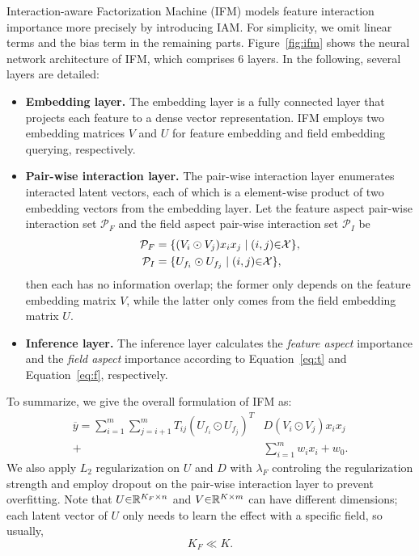 \documentclass[letterpaper]{article} \usepackage{aaai19}  \usepackage{times}  \usepackage{helvet}  \usepackage{courier}  \usepackage{url}  \usepackage{graphicx}  \frenchspacing  \setlength{\pdfpagewidth}{8.5in}  \setlength{\pdfpageheight}{11in}  \usepackage{mathtools}
\begin{document}
Interaction-aware Factorization Machine (IFM) models feature interaction importance more precisely by introducing IAM. For simplicity, we omit linear terms and the bias term in the remaining parts. Figure~\ref{fig:ifm} shows the neural network architecture of IFM, which comprises 6 layers. In the following, several layers are detailed:
\begin{itemize}
\item \textbf{Embedding layer.} The embedding layer is a fully connected layer that projects each feature to a dense vector representation. IFM employs two embedding matrices $V$ and $U$ for feature embedding and field embedding querying, respectively.

\item \textbf{Pair-wise interaction layer.} The pair-wise interaction layer enumerates interacted latent vectors, each of which is a element-wise product of two embedding vectors from the embedding layer. Let the feature aspect pair-wise interaction set $\mathcal{P}_F$ and the field aspect pair-wise interaction set $\mathcal{P}_I$ be
\begin{equation}
\begin{aligned}
\mathcal{P}_F &= \{(V_i \odot V_j)x_ix_j\mid (i,j)\text{\ensuremath{\in}}\mathcal{X}\}, \\
\mathcal{P}_I &= \{U_{f_i} \odot U_{f_j}\mid (i,j)\text{\ensuremath{\in}}\mathcal{X}\},
\end{aligned}
\label{eq:p}
\end{equation}
then each has no information overlap; the former only depends on the feature embedding matrix $V$, while the latter only comes from the field embedding matrix $U$.
\item \textbf{Inference layer.} The inference layer calculates the \emph{feature aspect} importance and the \emph{field aspect} importance according to Equation~\ref{eq:t} and Equation~\ref{eq:f}, respectively.
\end{itemize}
To summarize, we give the overall formulation of IFM as:
\begin{equation}
\begin{aligned}
\overline{y}= \sum_{i=1}^m\sum_{j=i+1}^{m}T_{ij}(U_{f_i} \odot U_{f_j})^T&D(V_i\odot V_j)x_{i}x_{j} \\
      + &\sum_{i=1}^m{w_{i}x_{i}} + w_0
 \text{.}
\label{eq:ifm}
\end{aligned}
\end{equation}
We also apply $L_2$ regularization on $U$ and $D$ with $\lambda_F$ controling the regularization strength and employ dropout\cite{srivastava2014dropout} on the pair-wise interaction layer to prevent overfitting. Note that $U\text{\ensuremath{\in}}\mathbb{R}^{ K_F \times n}$ and $V\text{\ensuremath{\in}}\mathbb{R}^{K\times m}$ can have different dimensions; each latent vector of $U$ only needs to learn the effect with a specific field, so usually,
\begin{equation}
K_F \ll  K.
\end{equation}
\end{document}
